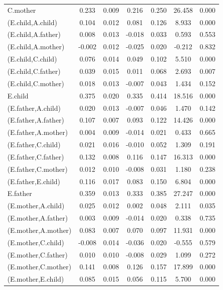 \documentclass[11pt,a5paper,twoside]{book}
\begin{document}
\begin{center}
\begin{longtable}{lcccccc}
   C.mother  & 0.233 & 0.009 & 0.216 & 0.250 & 26.458 & 0.000 \\ 
   (E.child,A.child)  & 0.104 & 0.012 & 0.081 & 0.126 & 8.933 & 0.000 \\ 
   (E.child,A.father)  & 0.008 & 0.013 & -0.018 & 0.033 & 0.593 & 0.553 \\ 
   (E.child,A.mother)  & -0.002 & 0.012 & -0.025 & 0.020 & -0.212 & 0.832 \\ 
   (E.child,C.child)  & 0.076 & 0.014 & 0.049 & 0.102 & 5.510 & 0.000 \\ 
   (E.child,C.father)  & 0.039 & 0.015 & 0.011 & 0.068 & 2.693 & 0.007 \\ 
   (E.child,C.mother)  & 0.018 & 0.013 & -0.007 & 0.043 & 1.434 & 0.152 \\ 
   E.child  & 0.375 & 0.020 & 0.335 & 0.414 & 18.516 & 0.000 \\ 
   (E.father,A.child)  & 0.020 & 0.013 & -0.007 & 0.046 & 1.470 & 0.142 \\ 
   (E.father,A.father)  & 0.107 & 0.007 & 0.093 & 0.122 & 14.426 & 0.000 \\ 
   (E.father,A.mother)  & 0.004 & 0.009 & -0.014 & 0.021 & 0.433 & 0.665 \\ 
   (E.father,C.child)  & 0.021 & 0.016 & -0.010 & 0.052 & 1.309 & 0.191 \\ 
   (E.father,C.father)  & 0.132 & 0.008 & 0.116 & 0.147 & 16.313 & 0.000 \\ 
   (E.father,C.mother)  & 0.012 & 0.010 & -0.008 & 0.031 & 1.180 & 0.238 \\ 
   (E.father,E.child)  & 0.116 & 0.017 & 0.083 & 0.150 & 6.804 & 0.000 \\ 
   E.father  & 0.359 & 0.013 & 0.333 & 0.385 & 27.247 & 0.000 \\ 
   (E.mother,A.child)  & 0.025 & 0.012 & 0.002 & 0.048 & 2.111 & 0.035 \\ 
   (E.mother,A.father)  & 0.003 & 0.009 & -0.014 & 0.020 & 0.338 & 0.735 \\ 
   (E.mother,A.mother)  & 0.083 & 0.007 & 0.070 & 0.097 & 11.931 & 0.000 \\ 
   (E.mother,C.child)  & -0.008 & 0.014 & -0.036 & 0.020 & -0.555 & 0.579 \\ 
   (E.mother,C.father)  & 0.010 & 0.010 & -0.008 & 0.029 & 1.099 & 0.272 \\ 
   (E.mother,C.mother)  & 0.141 & 0.008 & 0.126 & 0.157 & 17.899 & 0.000 \\ 
   (E.mother,E.child)  & 0.085 & 0.015 & 0.056 & 0.115 & 5.700 & 0.000 \\ 

\end{longtable}
\end{center}
\end{document}
